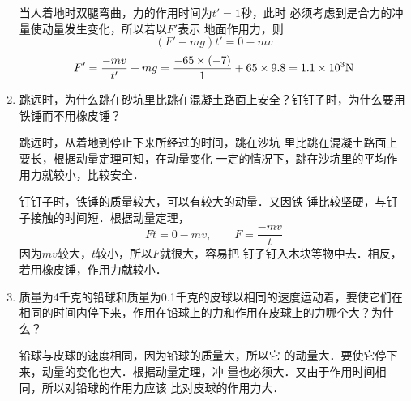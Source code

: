 \begin{enumerate}
\begin{solution}
当人着地时双腿弯曲，力的作用时间为$t'=1$秒，此时
必须考虑到是合力的冲量使动量发生变化，所以若以$F'$表示
地面作用力，则
\[(F'-mg)t'=0-mv\]
\[F'=\frac{-mv}{t'}+mg=\frac{-65\times (-7)}{1}+65\times 9.8=1.1\times 10^{3}{\rm N}\]
    \end{solution}
    \item 跳远时，为什么跳在砂坑里比跳在混凝土路面上安全？钉钉子时，为什么要用铁锤而不用橡皮锤？


    \begin{solution}
    跳远时，从着地到停止下来所经过的时间，跳在沙坑
里比跳在混凝土路面上要长，根据动量定理可知，在动量变化
一定的情况下，跳在沙坑里的平均作用力就较小，比较安全．

钉钉子时，铁锤的质量较大，可以有较大的动量．又因铁
锤比较坚硬，与钉子接触的时间短．根据动量定理，
\[Ft=0-mv,\qquad F=\frac{-mv}{t}\]
因为$mv$较大，$t$较小，所以$F$就很大，容易把
钉子钉入木块等物中去．相反，若用橡皮锤，作用力就较小．
    \end{solution}
    \item 质量为4千克的铅球和质量为0.1千克的皮球以相同的速度运动着，要使它们在相同的时间内停下来，作用在铅球上的力和作用在皮球上的力哪个大？为什么？


    \begin{solution}
    铅球与皮球的速度相同，因为铅球的质量大，所以它
的动量大．要使它停下来，动量的变化也大．根据动量定理，冲
量也必须大．又由于作用时间相同，所以对铅球的作用力应该
比对皮球的作用力大．
    \end{solution}
\end{enumerate}



